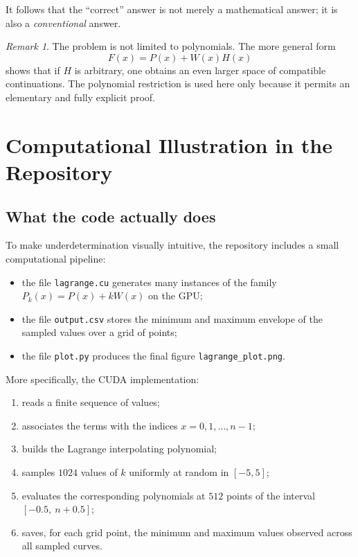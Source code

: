 \documentclass[10pt, a4paper]{article}
\theoremstyle{plain}
\theoremstyle{definition}
\theoremstyle{remark}
\newtheorem{remark}{Remark}
\begin{document}
It follows that the ``correct'' answer is not merely a mathematical answer; it
is also a \emph{conventional} answer.

\begin{remark}
The problem is not limited to polynomials. The more general form
\[
F(x)=P(x)+W(x)H(x)
\]
shows that if $H$ is arbitrary, one obtains an even larger space of compatible
continuations. The polynomial restriction is used here only because it permits
an elementary and fully explicit proof.
\end{remark}

\section{Computational Illustration in the Repository}
\label{sec:empirical}

\subsection{What the code actually does}

To make underdetermination visually intuitive, the repository includes a small
computational pipeline:
\begin{itemize}
    \item the file \texttt{lagrange.cu} generates many instances of the family
          $P_k(x)=P(x)+kW(x)$ on the GPU;
    \item the file \texttt{output.csv} stores the minimum and maximum envelope of
          the sampled values over a grid of points;
    \item the file \texttt{plot.py} produces the final figure
          \texttt{lagrange\_plot.png}.
\end{itemize}

More specifically, the CUDA implementation:
\begin{enumerate}[label=\arabic*.]
    \item reads a finite sequence of values;
    \item associates the terms with the indices $x=0,1,\ldots,n-1$;
    \item builds the Lagrange interpolating polynomial;
    \item samples $1024$ values of $k$ uniformly at random in $[-5,5]$;
    \item evaluates the corresponding polynomials at $512$ points of the
          interval $[-0.5,\ n+0.5]$;
    \item saves, for each grid point, the minimum and maximum values observed
          across all sampled curves.
\end{enumerate}
\end{document}
